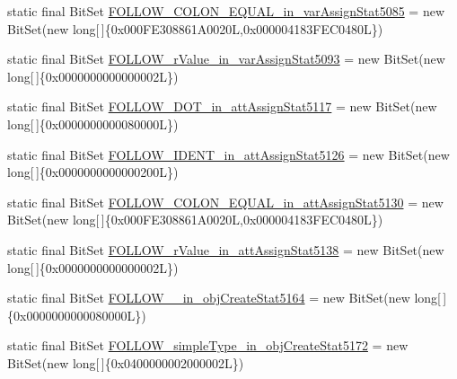 \begin{DoxyCompactItemize}
\item 
static final Bit\-Set \hyperlink{classorg_1_1tzi_1_1use_1_1parser_1_1testsuite_1_1_test_suite_parser_a7603300c4d77b94e45e550fdd980bd12}{F\-O\-L\-L\-O\-W\-\_\-\-C\-O\-L\-O\-N\-\_\-\-E\-Q\-U\-A\-L\-\_\-in\-\_\-var\-Assign\-Stat5085} = new Bit\-Set(new long\mbox{[}$\,$\mbox{]}\{0x000\-F\-E308861\-A0020\-L,0x000004183\-F\-E\-C0480\-L\})
\item 
static final Bit\-Set \hyperlink{classorg_1_1tzi_1_1use_1_1parser_1_1testsuite_1_1_test_suite_parser_a2b7b9b5907c36cfc5bea4b0cdf3cfd68}{F\-O\-L\-L\-O\-W\-\_\-r\-Value\-\_\-in\-\_\-var\-Assign\-Stat5093} = new Bit\-Set(new long\mbox{[}$\,$\mbox{]}\{0x0000000000000002\-L\})
\item 
static final Bit\-Set \hyperlink{classorg_1_1tzi_1_1use_1_1parser_1_1testsuite_1_1_test_suite_parser_a93e9aa0109f3376995934d63c5099848}{F\-O\-L\-L\-O\-W\-\_\-\-D\-O\-T\-\_\-in\-\_\-att\-Assign\-Stat5117} = new Bit\-Set(new long\mbox{[}$\,$\mbox{]}\{0x0000000000080000\-L\})
\item 
static final Bit\-Set \hyperlink{classorg_1_1tzi_1_1use_1_1parser_1_1testsuite_1_1_test_suite_parser_a594f0a0c9bc831c00bfafb56fb7f8087}{F\-O\-L\-L\-O\-W\-\_\-\-I\-D\-E\-N\-T\-\_\-in\-\_\-att\-Assign\-Stat5126} = new Bit\-Set(new long\mbox{[}$\,$\mbox{]}\{0x0000000000000200\-L\})
\item 
static final Bit\-Set \hyperlink{classorg_1_1tzi_1_1use_1_1parser_1_1testsuite_1_1_test_suite_parser_a2fbee9b9941184e0541af6aa4fdd4d6c}{F\-O\-L\-L\-O\-W\-\_\-\-C\-O\-L\-O\-N\-\_\-\-E\-Q\-U\-A\-L\-\_\-in\-\_\-att\-Assign\-Stat5130} = new Bit\-Set(new long\mbox{[}$\,$\mbox{]}\{0x000\-F\-E308861\-A0020\-L,0x000004183\-F\-E\-C0480\-L\})
\item 
static final Bit\-Set \hyperlink{classorg_1_1tzi_1_1use_1_1parser_1_1testsuite_1_1_test_suite_parser_a6c6afb9909c5610593763eac40e0e0d3}{F\-O\-L\-L\-O\-W\-\_\-r\-Value\-\_\-in\-\_\-att\-Assign\-Stat5138} = new Bit\-Set(new long\mbox{[}$\,$\mbox{]}\{0x0000000000000002\-L\})
\item 
static final Bit\-Set \hyperlink{classorg_1_1tzi_1_1use_1_1parser_1_1testsuite_1_1_test_suite_parser_a3ee0831ce557bca079862558ad10fd97}{F\-O\-L\-L\-O\-W\-\_\-\_\-in\-\_\-obj\-Create\-Stat5164} = new Bit\-Set(new long\mbox{[}$\,$\mbox{]}\{0x0000000000080000\-L\})
\item 
static final Bit\-Set \hyperlink{classorg_1_1tzi_1_1use_1_1parser_1_1testsuite_1_1_test_suite_parser_aa68a11e46fdedba34712686bfe01de40}{F\-O\-L\-L\-O\-W\-\_\-simple\-Type\-\_\-in\-\_\-obj\-Create\-Stat5172} = new Bit\-Set(new long\mbox{[}$\,$\mbox{]}\{0x0400000002000002\-L\})

\end{DoxyCompactItemize}
